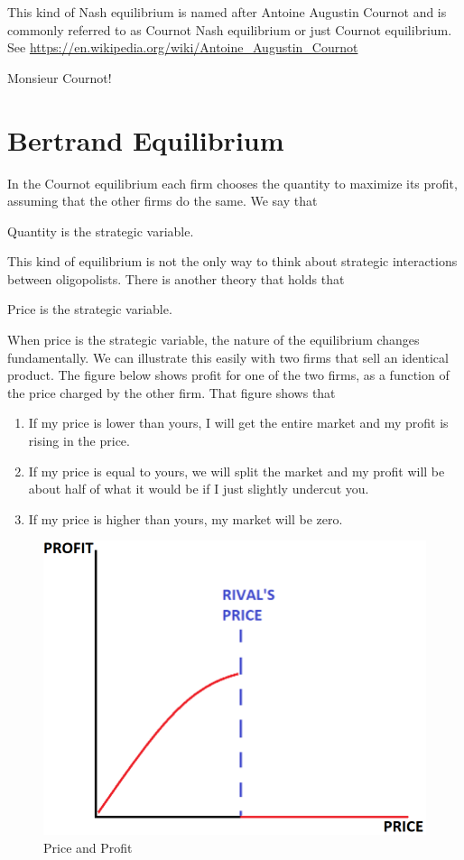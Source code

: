 \documentclass[
]{book}
\providecommand{\tightlist}{%
  \setlength{\itemsep}{0pt}\setlength{\parskip}{0pt}}
\begin{document}
This kind of Nash equilibrium is named after Antoine Augustin Cournot and is commonly referred to as Cournot Nash equilibrium or just Cournot equilibrium. See \url{https://en.wikipedia.org/wiki/Antoine_Augustin_Cournot}

Monsieur Cournot!

\hypertarget{bertrand-equilibrium}{%
\section{Bertrand Equilibrium}\label{bertrand-equilibrium}}

In the Cournot equilibrium each firm chooses the quantity to maximize its profit, assuming that the other firms do the same. We say that

\begin{center}
Quantity is the strategic variable.

\end{center}

This kind of equilibrium is not the only way to think about strategic interactions between oligopolists. There is another theory that holds that

\begin{center}
Price is the strategic variable.

\end{center}

When price is the strategic variable, the nature of the equilibrium changes fundamentally. We can illustrate this easily with two firms that sell an identical product. The figure below shows profit for one of the two firms, as a function of the price charged by the other firm. That figure shows that

\begin{enumerate}
\def\labelenumi{\arabic{enumi}.}
\tightlist
\item
  If my price is lower than yours, I will get the entire market and my profit is rising in the price.
\item
  If my price is equal to yours, we will split the market and my profit will be about half of what it would be if I just slightly undercut you.
\item
  If my price is higher than yours, my market will be zero.
\end{enumerate}

\begin{figure}

{\centering \includegraphics[width=0.5\linewidth]{img/oligopoly/fig6} 

}

\caption{Price and Profit}\label{fig:oligopoly06}
\end{figure}
\end{document}
